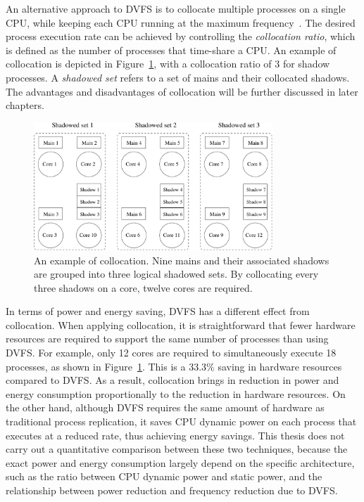 An alternative approach to DVFS is to collocate multiple processes on a single CPU, while keeping each CPU running at the maximum frequency~\cite{cui_2016_scalcom}. The desired process execution rate can be achieved by controlling the \textit{collocation ratio}, which is defined as the number of processes that time-share a CPU. An example of collocation is depicted in Figure~\ref{fig:sc_mapping},  with a collocation ratio of 3 for shadow processes. A \textit{shadowed set} refers to a set of mains and their collocated shadows. The advantages and disadvantages of collocation will be further discussed in later chapters. 

\begin{figure}[t]
	\begin{center}
		\includegraphics[width=0.8\textwidth]{Figures/sc_mapping.pdf}
	\end{center}
	\caption{An example of collocation. Nine mains and their associated shadows are grouped into three logical shadowed sets. By collocating every three shadows on a core, twelve cores are required.}
	\label{fig:sc_mapping}
\end{figure}

In terms of power and energy saving, DVFS has a different effect from collocation. 
When applying collocation, it is straightforward that fewer hardware resources are required to support the same number of processes than using DVFS. For example, only 12 cores are required to simultaneously execute 18 processes, as shown in Figure~\ref{fig:sc_mapping}. This is a 33.3\% saving in hardware resources compared to DVFS. As a result, collocation brings in reduction in power and energy consumption proportionally to the reduction in hardware resources. On the other hand, although DVFS requires the same amount of hardware as traditional process replication, it saves CPU dynamic power on each process that executes at a reduced rate, thus achieving energy savings. This thesis does not carry out a quantitative comparison between these two techniques, because the exact power and energy consumption largely depend on the specific architecture, such as the ratio between CPU dynamic power and static power, and the relationship between power reduction and frequency reduction due to DVFS.

